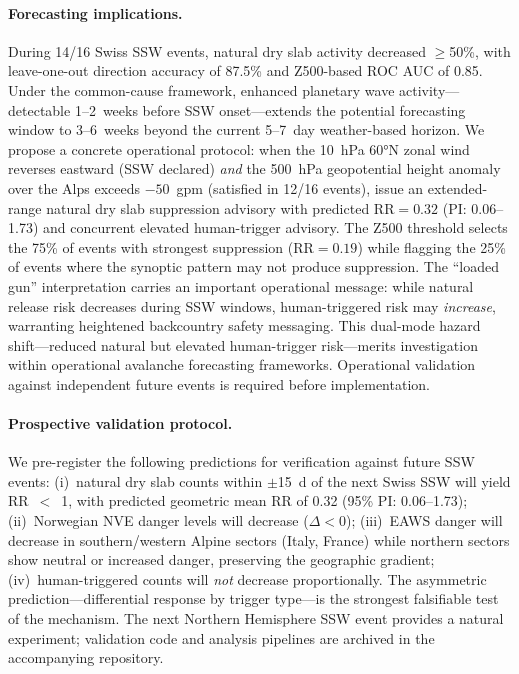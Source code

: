 \documentclass[11pt,letterpaper]{article}
\begin{document}
\paragraph{Forecasting implications.} During 14/16 Swiss SSW events, natural dry slab activity decreased $\geq$50\%, with leave-one-out direction accuracy of 87.5\% and Z500-based ROC AUC of 0.85. Under the common-cause framework, enhanced planetary wave activity---detectable 1--2~weeks before SSW onset\cite{Sigmond2013}---extends the potential forecasting window to 3--6~weeks beyond the current 5--7~day weather-based horizon. We propose a concrete operational protocol: when the 10~hPa 60°N zonal wind reverses eastward (SSW declared) \emph{and} the 500~hPa geopotential height anomaly over the Alps exceeds $-50$~gpm (satisfied in 12/16 events), issue an extended-range natural dry slab suppression advisory with predicted $\mathrm{RR} = 0.32$ (PI: 0.06--1.73) and concurrent elevated human-trigger advisory. The Z500 threshold selects the 75\% of events with strongest suppression ($\mathrm{RR} = 0.19$) while flagging the 25\% of events where the synoptic pattern may not produce suppression. The ``loaded gun'' interpretation carries an important operational message: while natural release risk decreases during SSW windows, human-triggered risk may \emph{increase}, warranting heightened backcountry safety messaging. This dual-mode hazard shift---reduced natural but elevated human-trigger risk---merits investigation within operational avalanche forecasting frameworks. Operational validation against independent future events is required before implementation.

\paragraph{Prospective validation protocol.} We pre-register the following predictions for verification against future SSW events: (i)~natural dry slab counts within $\pm$15~d of the next Swiss SSW will yield RR~$<$~1, with predicted geometric mean RR of 0.32 (95\% PI: 0.06--1.73); (ii)~Norwegian NVE danger levels will decrease ($\Delta < 0$); (iii)~EAWS danger will decrease in southern/western Alpine sectors (Italy, France) while northern sectors show neutral or increased danger, preserving the geographic gradient; (iv)~human-triggered counts will \emph{not} decrease proportionally. The asymmetric prediction---differential response by trigger type---is the strongest falsifiable test of the mechanism. The next Northern Hemisphere SSW event provides a natural experiment; validation code and analysis pipelines are archived in the accompanying repository.
\end{document}
